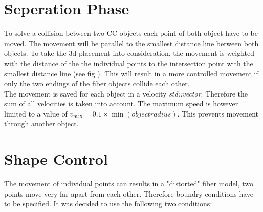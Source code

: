 \section{Seperation Phase}
To solve a collision between two \ac{CC} objects each point of both object have to be moved.
The movement will be parallel to the smallest distance line between both objects.
To take the 3d placement into consideration, the movement is weighted with the distance of the the individual points to the intersection point with the smallest distance line (see fig \dummy).
This will result in a more controlled movement if \eg only the two endings of the fiber objects collide each other. \\
% 
The movement is saved for each object in a velocity \textit{std::vector}.
Therefore the sum of all velocities is taken into account.
The maximum speed is however limited to a value of $v_{\max} = 0.1 \times \min(\mathit{object radius})$.
This prevents movement through another object.
% 
\section{Shape Control}\label{chap5:ShapeControl}
The movement of individual points can results in a "distorted" fiber model, \eg two points move very far apart from each other.
Therefore boundry conditions have to be specified.
It was decided to use the following two conditions:
% 

